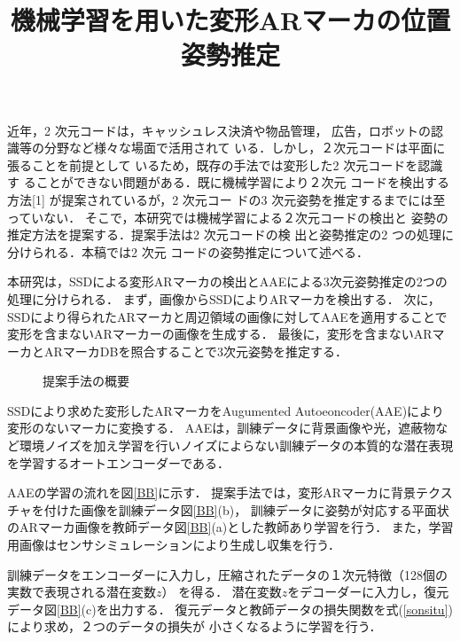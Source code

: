 \documentclass{jsarticle}
\title{機械学習を用いた変形ARマーカの位置姿勢推定}
\begin{document}
\maketitle

近年，2 次元コードは，キャッシュレス決済や物品管理，
広告，ロボットの認識等の分野など様々な場面で活用されて
いる．しかし，２次元コードは平面に張ることを前提として
いるため，既存の手法では変形した2 次元コードを認識す
ることができない問題がある．既に機械学習により２次元
コードを検出する方法[1] が提案されているが，2 次元コー
ドの3 次元姿勢を推定するまでには至っていない．
そこで，本研究では機械学習による２次元コードの検出と
姿勢の推定方法を提案する．提案手法は2 次元コードの検
出と姿勢推定の2 つの処理に分けられる．本稿では2 次元
コードの姿勢推定について述べる．


本研究は，SSDによる変形ARマーカの検出とAAEによる3次元姿勢推定の2つの処理に分けられる．
まず，画像からSSDによりARマーカを検出する．
次に，SSDにより得られたARマーカと周辺領域の画像に対してAAEを適用することで変形を含まないARマーカーの画像を生成する．
最後に，変形を含まないARマーカとARマーカDBを照合することで3次元姿勢を推定する．
\begin{figure}[ht]
\vspace{0zh}
\setlength{\epsfxsize}{7.5cm}
\centerline{}
\vspace{-1zh}
\caption{提案手法の概要}
\label{flow}
\vspace{-2zh}
\end{figure}

SSDにより求めた変形したARマーカをAugumented Autoeoncoder(AAE)により変形のないマーカに変換する．
AAEは，訓練データに背景画像や光，遮蔽物など環境ノイズを加え学習を行いノイズによらない訓練データの本質的な潜在表現を学習するオートエンコーダーである．

AAEの学習の流れを図\ref{BB}に示す．
提案手法では，変形ARマーカに背景テクスチャを付けた画像を訓練データ図\ref{BB}(b)，
訓練データに姿勢が対応する平面状のARマーカ画像を教師データ図\ref{BB}(a)とした教師あり学習を行う．
また，学習用画像はセンサシミュレーションにより生成し収集を行う．

訓練データをエンコーダーに入力し，圧縮されたデータの１次元特徴（128個の実数で表現される潜在変数$z$）
を得る．
潜在変数$z$をデコーダーに入力し，復元データ図\ref{BB}(c)を出力する．
復元データと教師データの損失関数を式(\ref{sonsitu})により求め，２つのデータの損失が
小さくなるように学習を行う．
\end{document}
